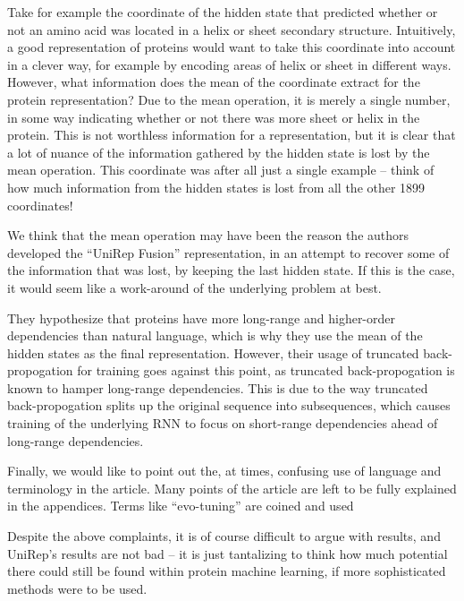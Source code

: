 \documentclass[a4paper,12pt]{article}
\begin{document}
Take for example the coordinate of the hidden state that predicted whether or not an amino acid was located in a helix or sheet secondary structure. Intuitively, a good representation of proteins would want to take this coordinate into account in a clever way, for example by encoding areas of helix or sheet in different ways. However, what information does the mean of the coordinate extract for the protein representation? Due to the mean operation, it is merely a single number, in some way indicating whether or not there was more sheet or helix in the protein. This is not worthless information for a representation, but it is clear that a lot of nuance of the information gathered by the hidden state is lost by the mean operation. This coordinate was after all just a single example -- think of how much information from the hidden states is lost from all the other 1899 coordinates!

We think that the mean operation may have been the reason the authors developed the ``UniRep Fusion'' representation, in an attempt to recover some of the information that was lost, by keeping the last hidden state. If this is the case, it would seem like a work-around of the underlying problem at best.

They hypothesize that proteins have more long-range and higher-order dependencies than natural language, which is why they use the mean of the hidden states as the final representation. However, their usage of truncated back-propogation for training goes against this point, as truncated back-propogation is known to hamper long-range dependencies. This is due to the way truncated back-propogation splits up the original sequence into subsequences, which causes training of the underlying RNN to focus on short-range dependencies ahead of long-range dependencies.

 Finally, we would like to point out the, at times, confusing use of language and terminology in the article. Many points of the article are left to be fully explained in the appendices. Terms like ``evo-tuning'' are coined and used

Despite the above complaints, it is of course difficult to argue with results, and UniRep's results are not bad -- it is just tantalizing to think how much potential there could still be found within protein machine learning, if more sophisticated methods were to be used.


\end{document}
